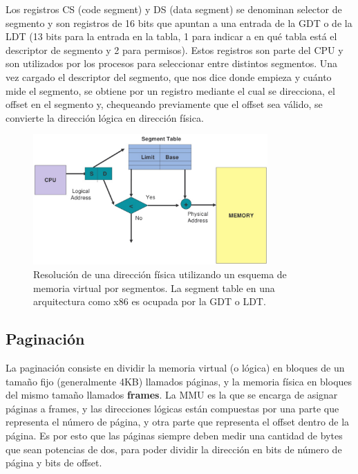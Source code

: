 \documentclass{article}
\begin{document}
Los registros CS (code segment) y DS (data segment) se denominan selector de segmento y son registros de 16 bits que apuntan a una entrada de la GDT o de la LDT (13 bits para la entrada en la tabla, 1 para indicar a en qu\'e tabla est\'a el descriptor de segmento y 2 para permisos). Estos registros son parte del CPU y son utilizados por los procesos para seleccionar entre distintos segmentos. Una vez cargado el descriptor del segmento, que nos dice donde empieza y cu\'anto mide el segmento, se obtiene por un registro mediante el cual se direcciona, el offset en el segmento y, chequeando previamente que el offset sea v\'alido, se convierte la direcci\'on l\'ogica en direcci\'on física.

\begin{figure}[H]
    \centering
    \includegraphics[width=0.8\textwidth]{imgs/memory_segmentation.png}
    \caption{Resolución de una dirección física utilizando un esquema de memoria virtual por segmentos. La segment table en una arquitectura como x86 es ocupada por la GDT o LDT.}
    \label{fig:memory_segmentation}
\end{figure}

\subsection{Paginaci\'on}

La paginaci\'on consiste en dividir la memoria virtual (o l\'ogica) en bloques de un tama\~no fijo (generalmente 4KB) llamados p\'aginas, y la memoria f\'isica en bloques del mismo tama\~no llamados \textbf{frames}. La MMU es la que se encarga de asignar p\'aginas a frames, y las direcciones l\'ogicas est\'an compuestas por una parte que representa el n\'umero de p\'agina, y otra parte que representa el offset dentro de la p\'agina. Es por esto que las p\'aginas siempre deben medir una cantidad de bytes que sean potencias de dos, para poder dividir la direcci\'on en bits de n\'umero de p\'agina y bits de offset.
\end{document}
